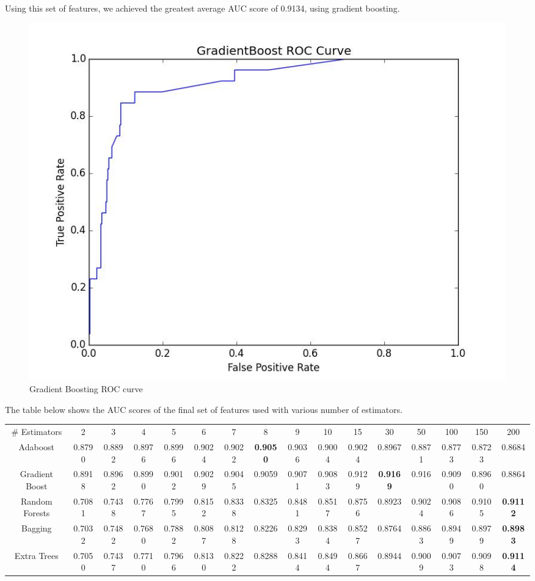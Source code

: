 \documentclass{article} %
\begin{document}
Using this set of features, we achieved the greatest average AUC score of 0.9134, using gradient boosting.

\clearpage

\begin{figure}[h]
\centering
{\caption{Gradient Boosting ROC curve} \includegraphics[scale=0.4]{img/grad_roc.jpg}}
\end{figure}

The table below shows the AUC scores of the final set of features used with various number of estimators.

\begin{adjustbox}{width=\textwidth,totalheight=\textheight,keepaspectratio}
\begin{tabular}{c | c c c c c c c c c c c c c c c}
\# Estimators & 2 & 3 & 4 & 5 & 6 & 7 & 8 & 9 & 10 & 15 & 30 & 50 & 100 & 150 & 200\\
Adaboost & 0.8790 & 0.8892 & 0.8976 & 0.8996 & 0.9024 & 0.9022 & \textbf{0.9050} & 0.9036 & 0.9004 & 0.9024 & 0.8967 & 0.8871 & 0.8773 & 0.8723 & 0.8684\\
\hline
Gradient Boost & 0.8918 & 0.8962 & 0.8990 & 0.9012 & 0.9029 & 0.9045 & 0.9059 & 0.9071 & 0.9083 & 0.9129 & \textbf{0.9169} & 0.916 & 0.9090 & 0.8960 & 0.8864\\
Random Forests & 0.7081 & 0.7438 & 0.7767 & 0.7995 & 0.8152 & 0.8338 & 0.8325 & 0.8481 & 0.8517 & 0.8756 & 0.8923 & 0.9024 & 0.9086 & 0.9105 & \textbf{0.9112}\\
Bagging & 0.7032 & 0.7482 & 0.7680 & 0.7882 & 0.8087 & 0.8128 & 0.8226 & 0.8293 & 0.8384 & 0.8527 & 0.8764 & 0.8863 & 0.8949 & 0.8979 & \textbf{0.8983}\\
Extra Trees & 0.7050 & 0.7437 & 0.7710 & 0.7966 & 0.8130 & 0.8222 & 0.8288 & 0.8414 & 0.8494 & 0.8667 & 0.8944 & 0.9009 & 0.9073 & 0.9098 & \textbf{0.9114}
\end{tabular}
\end{adjustbox}
\end{document}
